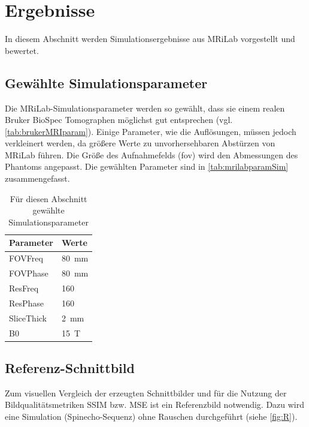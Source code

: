 \chapter{Ergebnisse}
\label{chap:ergb}
In diesem Abschnitt werden Simulationsergebnisse aus MRiLab vorgestellt und bewertet.

\section{Gewählte Simulationsparameter}
Die MRiLab-Simulationsparameter werden so gewählt, dass sie einem realen Bruker BioSpec Tomographen möglichst gut entsprechen (vgl. \autoref{tab:brukerMRIparam}). Einige Parameter, wie die Auflösungen, müssen jedoch verkleinert werden, da größere Werte zu unvorhersehbaren Abstürzen von MRiLab führen. Die Größe des Aufnahmefelds (\gls{fov}) wird den Abmessungen des Phantoms angepasst. Die gewählten Parameter sind in \autoref{tab:mrilabparamSim} zusammengefasst.

\begin{table}[H]
	\centering
	\caption[gewählte Simulationsparameter]{Für diesen Abschnitt gewählte Simulationsparameter}
	\label{tab:mrilabparamSim}
	\begin{tabularx}{0.3\textwidth}{lX}
		\toprule
		\textbf{Parameter} & \textbf{Werte}\\
		\midrule
		FOVFreq    & \SI{80}{\mm}\\
		FOVPhase   & \SI{80}{\mm}\\
		ResFreq    & 160\\
		ResPhase   & 160\\
		SliceThick & \SI{2}{\mm}\\
		B0         & \SI{15}{\tesla} \\
		\bottomrule
		\end{tabularx}
\end{table}

\clearpage
\section{Referenz-Schnittbild}
Zum visuellen Vergleich der erzeugten Schnittbilder und für die Nutzung der Bildqualitätsmetriken SSIM bzw. MSE ist ein Referenzbild notwendig. Dazu wird eine Simulation (Spinecho-Sequenz) ohne Rauschen durchgeführt (siehe \autoref{fig:R}).


